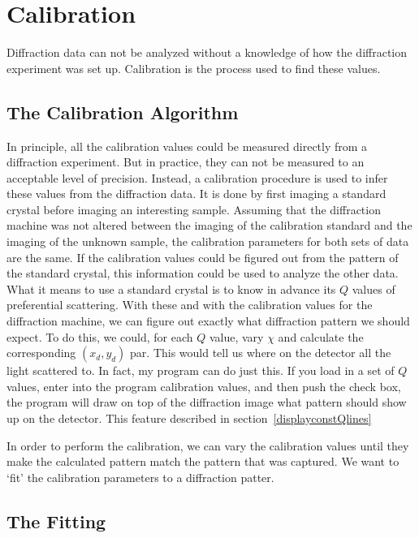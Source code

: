 \chapter{Calibration}\label{calibration}

Diffraction data can not be analyzed without
a knowledge of how the diffraction experiment was 
set up. Calibration is the process used to find these
values.

\section{The Calibration Algorithm}
    \label{cal_algorithm}

In principle, all the calibration values could be
measured directly from a diffraction experiment.
But in practice, they can not be measured to an 
acceptable level of precision. 
Instead, a calibration procedure is used to 
infer these values from the diffraction data. 
It is done by first imaging a standard
crystal before imaging an interesting sample. Assuming 
that the diffraction machine was not altered between the 
imaging of the calibration standard and the 
imaging of the unknown sample, 
the calibration parameters for both sets of data 
are the same. 
If the calibration values could be figured out from
the pattern of the standard crystal, this information 
could be used to analyze the other data.
What it means to use a standard crystal is to know 
in advance its $Q$ values of preferential 
scattering. With these and with the 
calibration values for the diffraction machine,
we can figure out exactly what diffraction
pattern we should expect. To do this, we could, for
each $Q$ value, vary $\chi$ and calculate the 
corresponding $(x_d,y_d)$ par. This would tell us 
where on the detector all the light scattered to.
In fact, my program can do just this. If you load in 
a set of $Q$ values, enter into the program 
calibration values, and then push the 
 check box, 
the program will draw on top of the diffraction
image what pattern should show up on the detector.
This feature described in section~\ref{displayconstQlines}

In order to perform the calibration, we can vary the 
calibration values until they make the calculated pattern 
match the pattern that was captured. We want to `fit' the 
calibration parameters to a diffraction patter. 

\section{The Fitting} 
\label{fitting_sec}

